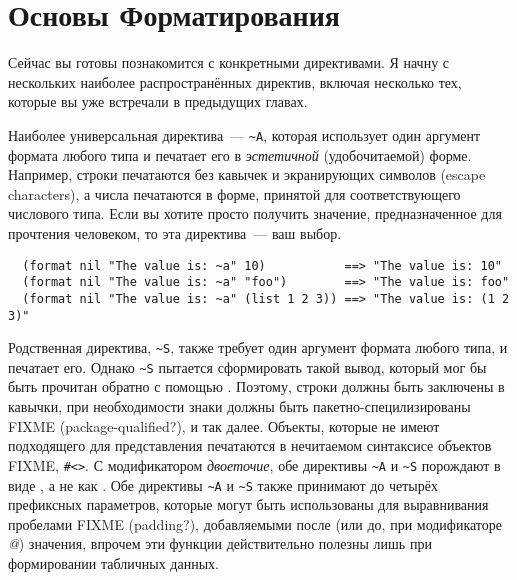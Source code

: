 \section{Основы Форматирования}

Сейчас вы готовы познакомится с конкретными директивами. Я начну с нескольких наиболее
распространённых директив, включая несколько тех, которые вы уже встречали в предыдущих
главах.

Наиболее универсальная директива~--- \lstinline!~A!, которая использует один аргумент
формата любого типа и печатает его в \textit{эстетичной} (удобочитаемой) форме. Например,
строки печатаются без кавычек и экранирующих символов (escape characters), а числа
печатаются в форме, принятой для соответствующего числового типа. Если вы хотите просто
получить значение, предназначенное для прочтения человеком, то эта директива~--- ваш выбор.

\begin{verbatim}
  (format nil "The value is: ~a" 10)           ==> "The value is: 10"
  (format nil "The value is: ~a" "foo")        ==> "The value is: foo"
  (format nil "The value is: ~a" (list 1 2 3)) ==> "The value is: (1 2 3)"
\end{verbatim}

Родственная директива, \lstinline!~S!, также требует один аргумент формата любого типа, и
печатает его. Однако \lstinline!~S!  пытается сформировать такой вывод, который мог бы
быть прочитан обратно с помощью . Поэтому, строки должны быть заключены в
кавычки, при необходимости знаки должны быть пакетно-специлизированы FIXME
(package-qualified?), и так далее. Объекты, которые не имеют подходящего для 
представления печатаются в нечитаемом синтаксисе объектов FIXME, \lstinline!#<>!. С
модификатором \textit{двоеточие}, обе директивы \lstinline!~A! и \lstinline!~S!  порождают
 в виде \code{()}, а не как . Обе директивы \lstinline!~A! и
\lstinline!~S! также принимают до четырёх префиксных параметров, которые могут быть
использованы для выравнивания пробелами FIXME (padding?), добавляемыми после (или до, при
модификаторе \textit{@}) значения, впрочем эти функции действительно полезны лишь при
формировании табличных данных.

